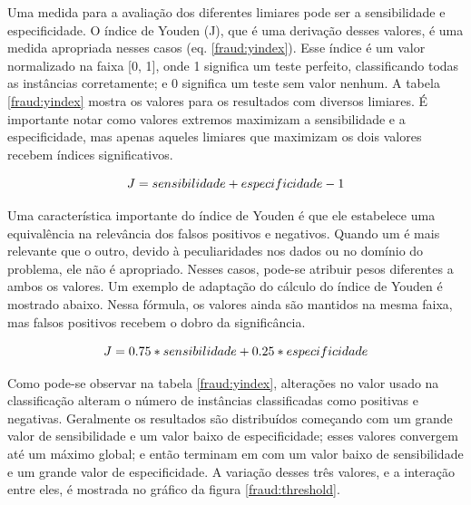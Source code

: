 Uma medida para a avaliação dos diferentes limiares pode ser a sensibilidade e especificidade. O índice de Youden (J), que é uma derivação desses valores, é uma medida apropriada nesses casos (eq. \ref{fraud:yindex}). Esse índice é um valor normalizado na faixa [0, 1], onde 1 significa um teste perfeito, classificando todas as instâncias corretamente; e 0 significa um teste sem valor nenhum. A tabela \ref{fraud:yindex} mostra os valores para os resultados com diversos limiares. É importante notar como valores extremos maximizam a sensibilidade e a especificidade, mas apenas aqueles limiares que maximizam os dois valores recebem índices significativos.

\begin{equation}
    \vspace{2mm}
    J = sensibilidade + especificidade - 1
    \label{fraud:yindex}
    \vspace{2mm}
\end{equation}

Uma característica importante do índice de Youden é que ele estabelece uma equivalência na relevância dos falsos positivos e negativos. Quando um é mais relevante que o outro, devido à peculiaridades nos dados ou no domínio do problema, ele não é apropriado. Nesses casos, pode-se atribuir pesos diferentes a ambos os valores. Um exemplo de adaptação do cálculo do índice de Youden é mostrado abaixo. Nessa fórmula, os valores ainda são mantidos na mesma faixa, mas falsos positivos recebem o dobro da significância.

\begin{equation}
    \vspace{2mm}
    J = 0.75 * sensibilidade + 0.25 * especificidade
    \vspace{2mm}
\end{equation}

Como pode-se observar na tabela \ref{fraud:yindex}, alterações no valor usado na classificação alteram o número de instâncias classificadas como positivas e negativas. Geralmente os resultados são distribuídos começando com um grande valor de sensibilidade e um valor baixo de especificidade; esses valores convergem até um máximo global; e então terminam em com um valor baixo de sensibilidade e um grande valor de especificidade. A variação desses três valores, e a interação entre eles, é mostrada no gráfico da figura \ref{fraud:threshold}.

